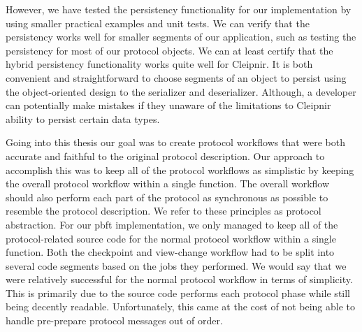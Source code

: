 However, we have tested the persistency functionality for our implementation by using smaller practical examples and unit tests. We can verify that the persistency works well for smaller segments of our application, such as testing the persistency for most of our protocol objects.
We can at least certify that the hybrid persistency functionality works quite well for Cleipnir. It is both convenient and straightforward to choose segments of an object to persist using the object-oriented design to the serializer and deserializer. Although, a developer can potentially make mistakes if they unaware of the limitations to Cleipnir ability to persist certain data types.


\iffalse
Going into this thesis our goal was to create protocol workflows that were both accurate and faithful to the original protocol description. Our approach to accomplish this was to keep all of the protocol workflows as simplistic by keeping the overall protocol workflow within a single function. The overall workflow should also perform each part of the protocol as synchronous as possible to resemble the protocol description. We refer to these principles as protocol abstraction. For our \ac{pbft} implementation, we only managed to keep all of the protocol-related source code for the normal protocol workflow within a single function. Both the checkpoint and view-change workflow had to be split into several code segments based on the jobs they performed. We would say that we were relatively successful for the normal protocol workflow in terms of simplicity. This is primarily due to the source code performs each protocol phase while still being decently readable. Unfortunately, this came at the cost of not being able to handle pre-prepare protocol messages out of order.

